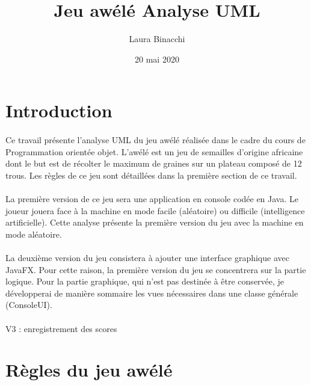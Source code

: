 \documentclass{article}
\title{Jeu awélé\bigbreak \bigbreak
    \large Analyse UML}
\date{20 mai 2020}
\author{Laura Binacchi}
\begin{document}
    
    \newpage
    \tableofcontents
    \newpage

    \section*{Introduction}
    \label{sec:intro}

    \paragraph{}
    Ce travail présente l'analyse UML du jeu awélé réalisée dans le cadre du cours de Programmation orientée objet. L'awélé est un jeu de semailles d'origine africaine dont le but est de récolter le maximum de graines sur un plateau composé de 12 trous. Les règles de ce jeu sont détaillées dans la première section de ce travail.

    \paragraph{}
    La première version de ce jeu sera une application en console codée en Java. Le joueur jouera face à la machine en mode facile (aléatoire) ou difficile (intelligence artificielle). Cette analyse présente la première version du jeu avec la machine en mode aléatoire.

    \paragraph{}
    La deuxième version du jeu consistera à ajouter une interface graphique avec JavaFX. Pour cette raison, la première version du jeu se concentrera sur la partie logique. Pour la partie graphique, qui n'est pas destinée à être conservée, je développerai de manière sommaire les vues nécessaires dans une classe générale (ConsoleUI).

    \paragraph{}
    V3 : enregistrement des scores
    
    \paragraph{}


    \newpage
    \section{Règles du jeu awélé}
\end{document}
